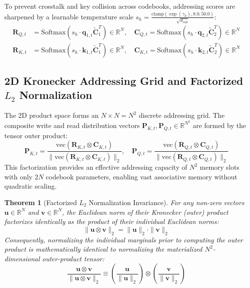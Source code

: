 \documentclass[11pt,a4paper]{article}
\newtheorem{theorem}{Theorem}[section]
\begin{document}
To prevent crosstalk and key collision across codebooks, addressing scores are sharpened by a learnable temperature scale $s_h = \frac{\text{clamp}(\exp(\gamma_h), 8.0, 50.0)}{\sqrt{d_{sub}}}$:
\begin{align}
    \mathbf{R}_{Q,t} &= \text{Softmax}(s_h \cdot \mathbf{q}_{1,t} \tilde{\mathbf{C}}_1^T) \in \mathbb{R}^N, \quad \mathbf{C}_{Q,t} = \text{Softmax}(s_h \cdot \mathbf{q}_{2,t} \tilde{\mathbf{C}}_2^T) \in \mathbb{R}^N \\
    \mathbf{R}_{K,t} &= \text{Softmax}(s_h \cdot \mathbf{k}_{1,t} \tilde{\mathbf{C}}_1^T) \in \mathbb{R}^N, \quad \mathbf{C}_{K,t} = \text{Softmax}(s_h \cdot \mathbf{k}_{2,t} \tilde{\mathbf{C}}_2^T) \in \mathbb{R}^N
\end{align}

\subsection{2D Kronecker Addressing Grid and Factorized $L_2$ Normalization}
The 2D product space forms an $N \times N = N^2$ discrete addressing grid. The composite write and read distribution vectors $\mathbf{P}_{K,t}, \mathbf{P}_{Q,t} \in \mathbb{R}^{N^2}$ are formed by the tensor outer product:
\begin{equation}
    \mathbf{P}_{K,t} = \frac{\text{vec}(\mathbf{R}_{K,t} \otimes \mathbf{C}_{K,t})}{\|\text{vec}(\mathbf{R}_{K,t} \otimes \mathbf{C}_{K,t})\|_2}, \quad \mathbf{P}_{Q,t} = \frac{\text{vec}(\mathbf{R}_{Q,t} \otimes \mathbf{C}_{Q,t})}{\|\text{vec}(\mathbf{R}_{Q,t} \otimes \mathbf{C}_{Q,t})\|_2}
\end{equation}
This factorization provides an effective addressing capacity of $N^2$ memory slots with only $2N$ codebook parameters, enabling vast associative memory without quadratic scaling.

\begin{theorem}[Factorized $L_2$ Normalization Invariance]
\label{thm:factorized_l2}
For any non-zero vectors $\mathbf{u} \in \mathbb{R}^N$ and $\mathbf{v} \in \mathbb{R}^N$, the Euclidean norm of their Kronecker (outer) product factorizes identically as the product of their individual Euclidean norms:
\begin{equation}
    \|\mathbf{u} \otimes \mathbf{v}\|_2 = \|\mathbf{u}\|_2 \cdot \|\mathbf{v}\|_2
\end{equation}
Consequently, normalizing the individual marginals prior to computing the outer product is mathematically identical to normalizing the materialized $N^2$-dimensional outer-product tensor:
\begin{equation}
    \frac{\mathbf{u} \otimes \mathbf{v}}{\|\mathbf{u} \otimes \mathbf{v}\|_2} \equiv \left(\frac{\mathbf{u}}{\|\mathbf{u}\|_2}\right) \otimes \left(\frac{\mathbf{v}}{\|\mathbf{v}\|_2}\right)
\end{equation}
\end{theorem}
\end{document}
